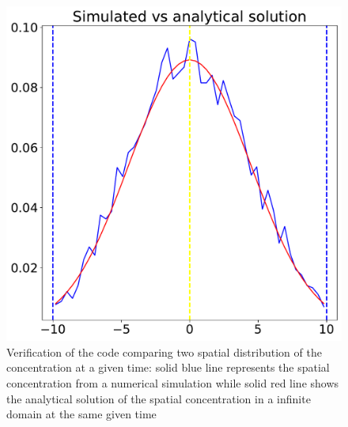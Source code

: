 \documentclass{cup-ino}
\begin{document}
\begin{figure}[bt!]
\begin{minipage}{0.47\textwidth}
\includegraphics[width=\linewidth]{images/verificationInfinite.pdf}
\end{minipage}
\caption{Verification of the code comparing two spatial distribution of the concentration at a given time: solid blue line represents the spatial concentration from a numerical simulation while solid red line shows the analytical solution of the spatial concentration in a infinite domain at the same given time}
\label{fig:twosubs}
\end{figure}
\end{document}
